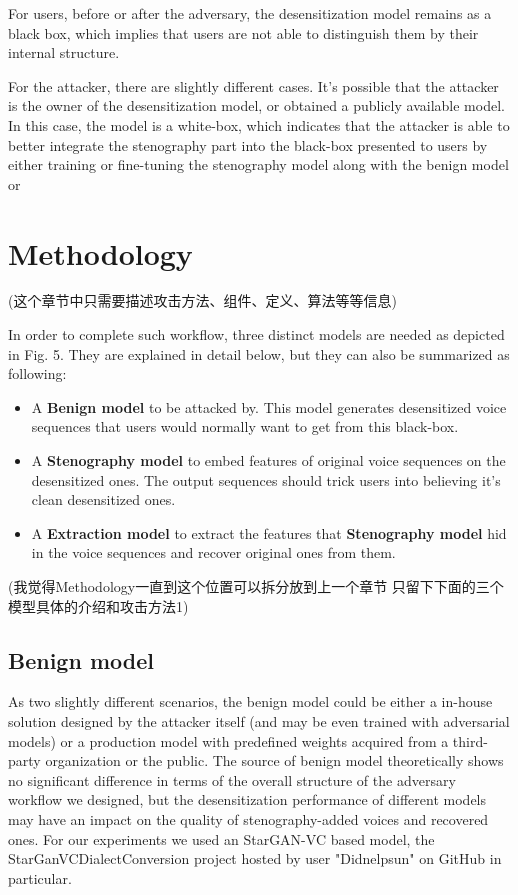 \documentclass[journal]{IEEEtran} %
\begin{document}
\begin{CJK*}{UTF8}{gbsn}
For users, before or after the adversary, the desensitization model remains as a black box, which implies that users are not able to distinguish them by their internal structure.

For the attacker, there are slightly different cases. It's possible that the attacker is the owner of the desensitization model, or obtained a publicly available model. In this case, the model is a white-box, which indicates that the attacker is able to better integrate the stenography part into the black-box presented to users by either training or fine-tuning the stenography model along with the benign model or 

\section{Methodology}
(这个章节中只需要描述攻击方法、组件、定义、算法等等信息)

In order to complete such workflow, three distinct models are needed as depicted in Fig. 5. They are explained in detail below, but they can also be summarized as following:
\begin{itemize}
    \item A \textbf{Benign model} to be attacked by. This model generates desensitized voice sequences that users would normally want to get from this black-box.
    \item A \textbf{Stenography model} to embed features of original voice sequences on the desensitized ones. The output sequences should trick users into believing it's clean desensitized ones.
    \item A \textbf{Extraction model} to extract the features that \textbf{Stenography model} hid in the voice sequences and recover original ones from them.
\end{itemize}

(我觉得Methodology一直到这个位置可以拆分放到上一个章节 只留下下面的三个模型具体的介绍和攻击方法1)

\subsection{Benign model}

As two slightly different scenarios, the benign model could be either a in-house solution designed by the attacker itself (and may be even trained with adversarial models) or a production model with predefined weights acquired from a third-party organization or the public. The source of benign model theoretically shows no significant difference in terms of the overall structure of the adversary workflow we designed, but the desensitization performance of different models may have an impact on the quality of stenography-added voices and recovered ones. For our experiments we used an StarGAN-VC\cite{a3} based model, the StarGanVCDialectConversion project hosted by user "Didnelpsun" on GitHub\cite{a2} in particular.


\end{CJK*}
\end{document}
